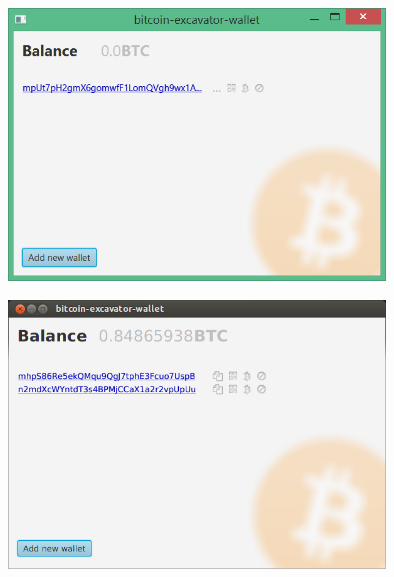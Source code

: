 \documentclass[11pt,a4paper]{article}
\begin{document}
\includegraphics[width=10cm]{images/wallet_main_screen.PNG}

\includegraphics[width=10cm]{images/wallet_main_screen_ubuntu.PNG}
\end{document}
